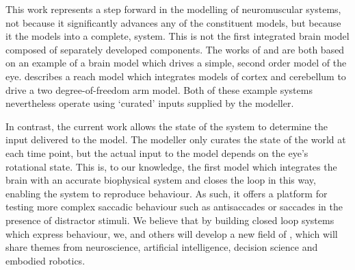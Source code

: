 \documentclass{frontiersSCNS}
\begin{document}
This work represents a step forward in the modelling of neuromuscular systems,
not because it significantly advances any of the constituent models, but
because it  the models into a complete,  system.
This is not the first integrated brain model composed of separately developed
components. The works of \cite{nguyen_saccade_2014} and
\cite{thurat_biomimetic_2015} are both based
on an example of a brain model which drives a simple, second order model of the
eye. \cite{dewolf_spiking_2016} describes a reach model which integrates models
of cortex and cerebellum to drive a two degree-of-freedom arm model. Both of
these example systems nevertheless operate using `curated' inputs supplied
by the modeller.

In contrast, the current work allows the state of the system to determine the
input delivered to the model. The modeller only curates the state of the world
at each time point, but the actual input to the model depends on the eye's
rotational state.
This is, to our knowledge, the first model which integrates the brain with an
accurate biophysical system and closes the loop in this way, enabling the
system to reproduce behaviour.
As such, it offers a platform for testing more complex saccadic behaviour such as
antisaccades or saccades in the presence of distractor stimuli. We believe
that by building closed loop systems which express behaviour, we, and others
will develop a new field of , which will share
themes from neuroscience, artificial intelligence, decision science and embodied
robotics.


\end{document}
